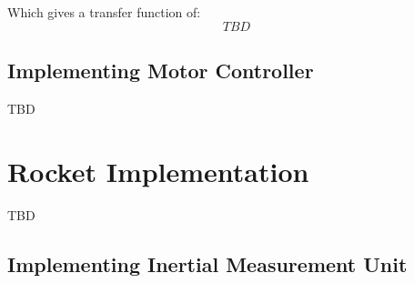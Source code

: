 Which gives a transfer function of:
\begin{equation}
TBD
\end{equation}

\subsection{Implementing Motor Controller}
TBD


\section{Rocket Implementation}
TBD

\subsection{Implementing Inertial Measurement Unit}